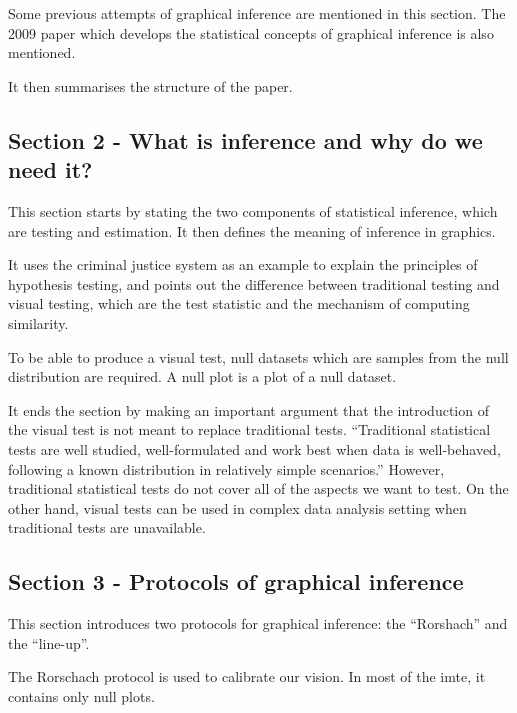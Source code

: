 \documentclass[
]{book}
\begin{document}
Some previous attempts of graphical inference are mentioned in this section. The 2009 paper which develops the statistical concepts of graphical inference is also mentioned.

It then summarises the structure of the paper.

\hypertarget{section-2---what-is-inference-and-why-do-we-need-it}{%
\subsection{Section 2 - What is inference and why do we need it?}\label{section-2---what-is-inference-and-why-do-we-need-it}}

This section starts by stating the two components of statistical inference, which are testing and estimation. It then defines the meaning of inference in graphics.

It uses the criminal justice system as an example to explain the principles of hypothesis testing, and points out the difference between traditional testing and visual testing, which are the test statistic and the mechanism of computing similarity.

To be able to produce a visual test, null datasets which are samples from the null distribution are required. A null plot is a plot of a null dataset.

It ends the section by making an important argument that the introduction of the visual test is not meant to replace traditional tests. ``Traditional statistical tests are well studied, well-formulated and work best when data is well-behaved, following a known distribution in relatively simple scenarios.'' However, traditional statistical tests do not cover all of the aspects we want to test. On the other hand, visual tests can be used in complex data analysis setting when traditional tests are unavailable.

\hypertarget{section-3---protocols-of-graphical-inference}{%
\subsection{Section 3 - Protocols of graphical inference}\label{section-3---protocols-of-graphical-inference}}

This section introduces two protocols for graphical inference: the ``Rorshach'' and the ``line-up''.

The Rorschach protocol is used to calibrate our vision. In most of the imte, it contains only null plots.
\end{document}
